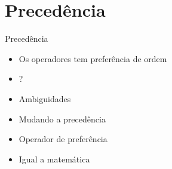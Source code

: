 \documentclass[11pt]{beamer}
\begin{document}
	\section{Precedência}
	\begin{frame}{Precedência}
		\only<1>
		{
			\begin{itemize}
				\presentationPause\item Os operadores tem preferência de ordem
				\presentationPause\item {} ?
			\end{itemize}
			\presentationPause
			\presentationPause
		}
		{

			\begin{itemize}
				\presentationPause\item Ambiguidades
				\presentationPause\item Mudando a precedência
				\presentationPause\item Operador de preferência
				\presentationPause\item Igual a matemática
			\end{itemize}
		}
		{
			\begin{table}[!h]
				\footnotesize\centering
				\caption{Ordem de precedência de operadores}
			

\end{table}}
\end{frame}
\end{document}
